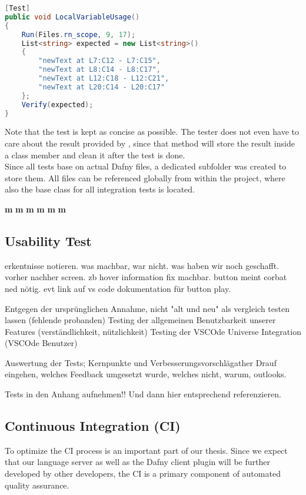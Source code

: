 \begin{lstlisting}[language=csharp, caption={Sample Integration Test}, captionpos=b, label={lst:sampleintegrationtest}]
[Test]
public void LocalVariableUsage()
{
    Run(Files.rn_scope, 9, 17);
    List<string> expected = new List<string>()
    {
        "newText at L7:C12 - L7:C15",
        "newText at L8:C14 - L8:C17",
        "newText at L12:C18 - L12:C21",
        "newText at L20:C14 - L20:C17"
    };
    Verify(expected);
}
\end{lstlisting}

Note that the test is kept as concise as possible.
The tester does not even have to care about the result provided by , since that method will store the result inside a class member and clean it after the test is done.\\

Since all tests base on actual Dafny files, a dedicated subfolder was created to store them.
All files can be referenced globally from within the  project, where also the base class for all integration tests is located.



\textbf{m}
\textbf{m}
\textbf{m}
\textbf{m}
\textbf{m}
\textbf{m}


\subsection{Usability Test}


erkentnisse notieren. was machbar, war nicht. was haben wir noch geschafft. vorher nachher screen.
zb hover information fix machbar. button meint corbat ned nötig. evt link auf vs code dokumentation für button play.

Entgegen der ursprünglichen Annahme, nicht "alt und neu" als vergleich testen lassen (fehlende probanden)
Testing der allgemeinen Benutzbarkeit unserer Features (verständlichkeit, nützlichkeit)
Testing der VSCOde Universe Integration (VSCOde Benutzer)

Auswertung der Tests; Kernpunkte und Verbesserungsvorschlägather
Drauf eingehen, welches Feedback umgesetzt wurde, welches nicht, warum, outlooks.

Tests in den Anhang aufnehmen!! Und dann hier entsprechend referenzieren.

\subsection{Continuous Integration (CI)}
To optimize the CI process is an important part of our thesis.
Since we expect that our language server as well as the Dafny client plugin will be further developed by other developers,
the CI is a primary component of automated quality assurance. \\

